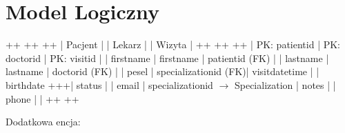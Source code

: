 \documentclass[a4paper,11pt,openany,english]{sphinxmanual}
\begin{document}
\section{Model Logiczny}
\label{\detokenize{rozdzial3/index:model-logiczny}}
\begin{sphinxVerbatim}[commandchars=\\\{\}]
+\PYGZhy{}\PYGZhy{}\PYGZhy{}\PYGZhy{}\PYGZhy{}\PYGZhy{}\PYGZhy{}\PYGZhy{}\PYGZhy{}\PYGZhy{}\PYGZhy{}\PYGZhy{}\PYGZhy{}+       +\PYGZhy{}\PYGZhy{}\PYGZhy{}\PYGZhy{}\PYGZhy{}\PYGZhy{}\PYGZhy{}\PYGZhy{}\PYGZhy{}\PYGZhy{}\PYGZhy{}\PYGZhy{}+       +\PYGZhy{}\PYGZhy{}\PYGZhy{}\PYGZhy{}\PYGZhy{}\PYGZhy{}\PYGZhy{}\PYGZhy{}\PYGZhy{}\PYGZhy{}\PYGZhy{}+
|   Pacjent   |       |   Lekarz   |       |   Wizyta  |
+\PYGZhy{}\PYGZhy{}\PYGZhy{}\PYGZhy{}\PYGZhy{}\PYGZhy{}\PYGZhy{}\PYGZhy{}\PYGZhy{}\PYGZhy{}\PYGZhy{}\PYGZhy{}\PYGZhy{}+       +\PYGZhy{}\PYGZhy{}\PYGZhy{}\PYGZhy{}\PYGZhy{}\PYGZhy{}\PYGZhy{}\PYGZhy{}\PYGZhy{}\PYGZhy{}\PYGZhy{}\PYGZhy{}+       +\PYGZhy{}\PYGZhy{}\PYGZhy{}\PYGZhy{}\PYGZhy{}\PYGZhy{}\PYGZhy{}\PYGZhy{}\PYGZhy{}\PYGZhy{}\PYGZhy{}+
| PK: patient\PYGZus{}id    | PK: doctor\PYGZus{}id   | PK: visit\PYGZus{}id    |
| first\PYGZus{}name        | first\PYGZus{}name      | patient\PYGZus{}id (FK) |
| last\PYGZus{}name         | last\PYGZus{}name       | doctor\PYGZus{}id  (FK) |
| pesel             | specialization\PYGZus{}id (FK)| visit\PYGZus{}datetime |
| birth\PYGZus{}date        +\PYGZhy{}\PYGZhy{}\PYGZhy{}\PYGZhy{}\PYGZhy{}\PYGZhy{}\PYGZhy{}\PYGZhy{}\PYGZhy{}\PYGZhy{}\PYGZhy{}\PYGZhy{}+\PYGZhy{}\PYGZhy{}\PYGZhy{}+| status         |
| email             | specialization\PYGZus{}id \(\rightarrow\) Specialization | notes |
| phone             |                |
+\PYGZhy{}\PYGZhy{}\PYGZhy{}\PYGZhy{}\PYGZhy{}\PYGZhy{}\PYGZhy{}\PYGZhy{}\PYGZhy{}\PYGZhy{}\PYGZhy{}\PYGZhy{}\PYGZhy{}+     +\PYGZhy{}\PYGZhy{}\PYGZhy{}\PYGZhy{}\PYGZhy{}\PYGZhy{}\PYGZhy{}\PYGZhy{}\PYGZhy{}\PYGZhy{}\PYGZhy{}\PYGZhy{}\PYGZhy{}\PYGZhy{}+
\end{sphinxVerbatim}

\sphinxAtStartPar
Dodatkowa encja:
\end{document}
